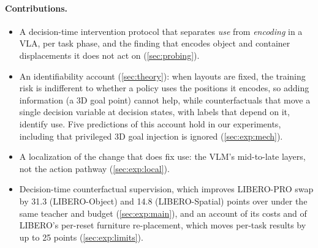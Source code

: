 \paragraph{Contributions.}
\begin{itemize}
\item A decision-time intervention protocol that separates \emph{use} from \emph{encoding} in a VLA, per task phase, and
the finding that \pizf encodes object and container displacements it does not act on (\cref{sec:probing}).
\item An identifiability account (\cref{sec:theory}): when layouts are fixed, the training risk is indifferent to whether
a policy uses the positions it encodes, so adding information (\eg a 3D goal point) cannot help, while counterfactuals
that move a single decision variable at decision states, with labels that depend on it, identify use. Five predictions of
this account hold in our experiments, including that privileged 3D goal injection is ignored (\cref{sec:exp:mech}).
\item A localization of the change that does fix use: the VLM's mid-to-late layers, not the action pathway
(\cref{sec:exp:local}).
\item Decision-time counterfactual supervision, which improves LIBERO-PRO swap by 31.3 (LIBERO-Object) and 14.8
(LIBERO-Spatial) points over \ect under the same teacher and budget (\cref{sec:exp:main}), and an account of its costs and
of LIBERO's per-reset furniture re-placement, which moves per-task results by up to 25 points (\cref{sec:exp:limits}).
\end{itemize}
